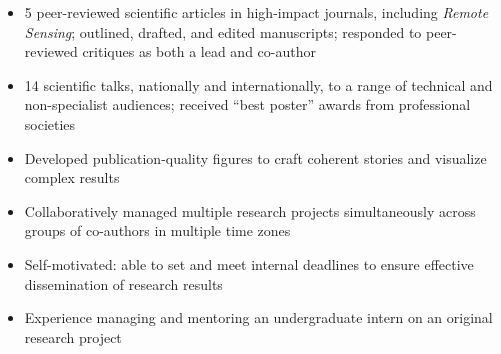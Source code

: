 \documentclass[10pt,letterpaper,ragged2e,withhyper]{altacv}
\begin{document}
\begin{paracol}{2}
  \vspace{-0.75em}
  \divider

  \begin{itemize}
    \item 5 peer-reviewed scientific articles in high-impact journals, including \textit{Remote Sensing}; outlined, drafted,
    and edited manuscripts; responded to peer-reviewed critiques as both a lead and co-author
    \item 14 scientific talks, nationally and internationally, to a range of technical and non-specialist audiences; received ``best poster'' awards from professional societies
    \item Developed publication-quality figures to craft coherent stories and visualize complex results
  \end{itemize}

  \vspace{-0.75em}
  \divider

  \begin{itemize}
    \item Collaboratively managed multiple research projects simultaneously across groups of co-authors in multiple time zones
    \item Self-motivated: able to set and meet internal deadlines to ensure effective dissemination of research results
    \item Experience managing and mentoring an undergraduate intern on an original research project
  \end{itemize}








\end{paracol}
\end{document}

